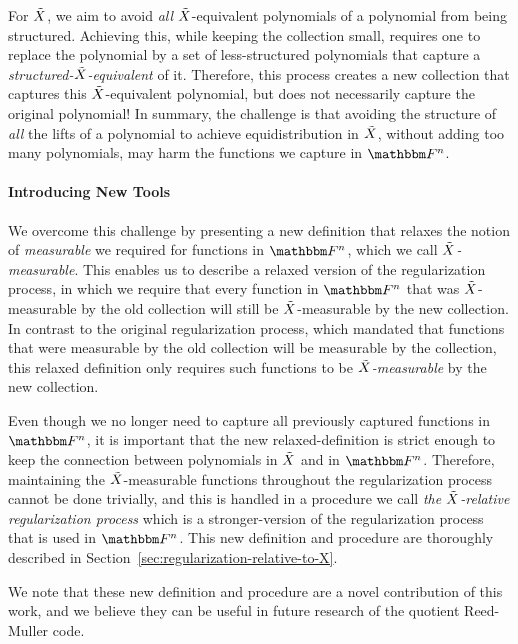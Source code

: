 \newline
For ${\tilde{X}}$, we aim to avoid \emph{all} ${\tilde{X}}$-equivalent polynomials of a polynomial from being structured.
Achieving this, while keeping the collection small,
requires one to replace the polynomial by a set of less-structured polynomials that capture a \emph{structured-${\tilde{X}}$-equivalent} of it.
Therefore, this process creates a new collection that captures this ${\tilde{X}}$-equivalent polynomial,
but does not necessarily capture the original polynomial!
\newline
In summary, the challenge is that avoiding the structure of \emph{all} the lifts of a polynomial to achieve equidistribution in ${\tilde{X}}$,
without adding too many polynomials, may harm the functions we capture in $\field$.

\paragraph{Introducing New Tools}
We overcome this challenge by presenting a new definition that relaxes the notion of \emph{measurable} we required for functions in $\field$,
which we call \emph{${\tilde{X}}$-measurable}.
This enables us to describe a relaxed version of the regularization process,
in which we require that every function in $\field$ that was ${\tilde{X}}$-measurable by the old collection will still be ${\tilde{X}}$-measurable by the new collection.
In contrast to the original regularization process, which mandated that functions that were measurable by the old collection will be measurable by the collection,
this relaxed definition only requires such functions to be \emph{${\tilde{X}}$-measurable} by the new collection.

Even though we no longer need to capture all previously captured functions in $\field$,
it is important that the new relaxed-definition is strict enough to keep the connection between polynomials in ${\tilde{X}}$ and in $\field$.
Therefore, maintaining the ${\tilde{X}}$-measurable functions throughout the regularization process cannot be done trivially,
and this is handled in a procedure we call \emph{the ${\tilde{X}}$-relative regularization process} which is a stronger-version of the regularization process that is used in $\field$.
This new definition and procedure are thoroughly described in Section~\ref{sec:regularization-relative-to-X}.

We note that these new definition and procedure are a novel contribution of this work, and we believe they can
be useful in future research of the quotient Reed-Muller code.


